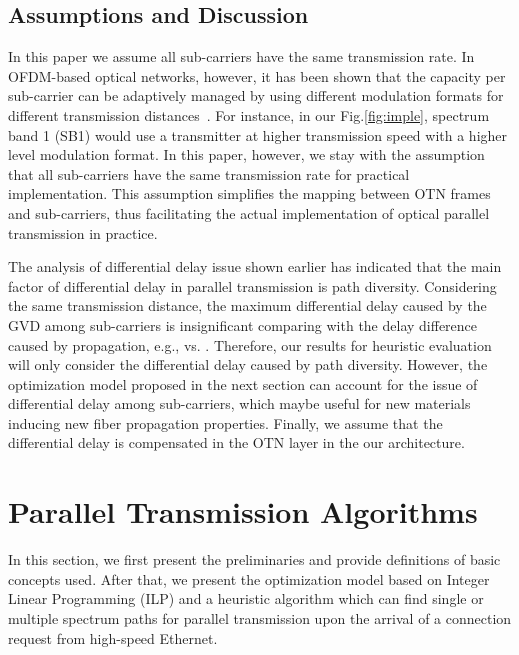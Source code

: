\documentclass[conference]{IEEEtran}
\begin{document}
 \subsection{Assumptions and Discussion}
\par In this paper we assume all sub-carriers have the same transmission rate. In OFDM-based optical networks,  however, it has 
been shown that the capacity per sub-carrier can be adaptively managed by using different modulation formats for 
different transmission distances~\cite{Christo:JLT:2011}\cite{Jinno:2010}. For 
instance, in our Fig.\ref{fig:imple}, spectrum band 1 (SB1) would use a transmitter at higher transmission speed with a higher level modulation format. In this paper, however, we stay with  the assumption that all sub-carriers have 
the same transmission rate for practical implementation.  This assumption  simplifies the  mapping between OTN frames and sub-carriers, thus  facilitating the actual implementation of optical parallel transmission in practice. 
\par The analysis of differential delay issue shown earlier has indicated that the main factor of differential delay in parallel transmission is path diversity. Considering the same transmission distance, the maximum differential delay caused by the GVD among sub-carriers is insignificant comparing with the delay difference caused by propagation, e.g.,  vs. .  Therefore, our results  for heuristic evaluation will only consider the differential delay caused by path diversity. However, the optimization model proposed in the next section can account for the issue of differential delay among  sub-carriers, which maybe useful for new materials inducing new   fiber propagation properties. Finally, we assume that the differential delay is compensated in the OTN layer in the our architecture.


\section{Parallel Transmission Algorithms}\label{algo}
In this section, we first present the preliminaries and provide definitions of basic concepts used. After that, we present the optimization model based on Integer Linear Programming (ILP) and a heuristic algorithm which can find single or multiple spectrum paths for parallel transmission upon the arrival of a connection 
request from high-speed Ethernet.    
\end{document}
